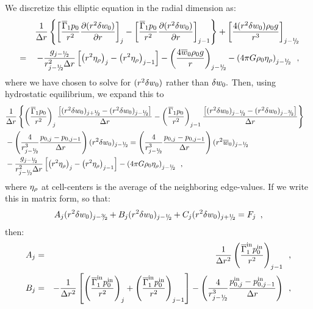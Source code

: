 \begin{enumerate}
\begin{description}
\noindent We discretize this elliptic equation in the radial dimension as:
\begin{eqnarray}
&& \frac{1}{\Delta r} \left\{
\left[ \frac{\gammabar p_0}{r^2} \frac{\partial (r^2 \dw)}{\partial r} \right]_{j} -
\left[ \frac{\gammabar p_0}{r^2} \frac{\partial (r^2 \dw)}{\partial r} \right]_{j-1} \right\}
+ \left[ \frac{4 (r^2 \dw) \rho_0 g}{r^3} \right]_{j-\myhalf} \nonumber\\
&=& 
- \frac{g_{j-\myhalf}}{r_{j-\myhalf}^2 \Delta r} 
\left[ \left( r^2 \etarho \right)_{j} - \left( r^2 \etarho  \right)_{j-1} \right] 
   - \left( \frac{4 \ow \rho_0 g}{r} \right)_{j-\myhalf}
   - \left(  4 \pi G \rhozero \etarho   \right)_{j-\myhalf} \enskip ,
\end{eqnarray}
where we have chosen to solve for $(r^2 \delta w_0)$ rather than $\delta w_0.$
Then, using hydrostatic equilibrium, we expand this to 
\begin{eqnarray}
& \frac{1}{\Delta r} \left\{
 \left( \frac{\gammabar p_0}{r^2}\right)_{j  } \frac{\left[ (r^2 \dw)_{j+\myhalf} - (r^2 \dw)_{j-\myhalf} \right]}{\Delta r} -\left( \frac{\gammabar p_0}{r^2}\right)_{j-1} \frac{\left[ (r^2 \dw)_{j-\myhalf} - (r^2 \dw)_{j-\thalf}\right]}{\Delta r} \right\} & \nonumber \\
&  - \left( \frac{4}{r_{j-\myhalf} ^3} \frac{p_{0,j} - p_{0,j-1}}{\dr} \right) (r^2 \dw)_{j-\myhalf} = \left( \frac{4}{r_{j-\myhalf} ^3} \frac{p_{0,j} - p_{0,j-1}}{\dr} \right) (r^2 \ow)_{j-\myhalf} & \nonumber \\
& - \frac{g_{j-\myhalf}}{r_{j-\myhalf}^2 \Delta r} 
  \left[ \left( r^2 \etarho \right)_{j} - \left( r^2 \etarho  \right)_{j-1} \right] 
- \left(  4 \pi G \rhozero \etarho   \right)_{j-\myhalf} \enskip, &
\end{eqnarray}
where $\eta_{\rho}$ at cell-centers is the average of the neighboring edge-values.  
If we write this in matrix form, so that:
\begin{equation}
A_j (r^2 \dw)_{j-\thalf} + B_j (r^2 \dw)_{j-\myhalf} + C_j (r^2 \dw)_{j+\myhalf} = F_j\enskip,
\end{equation}
then:
\begin{eqnarray}
A_j &=& \frac{1}{\Delta r^2} \left( \frac{\gammabar^{\inp} p_0^{\inp}}{r^2}\right)_{j-1}  \enskip, \\
B_j &=& -\frac{1}{\Delta r^2} \left[ \left( \frac{\gammabar^{\inp} p_0^{\inp}}{r^2}\right)_{j  }  
               +\left( \frac{\gammabar^{\inp} p_0^{\inp}}{r^2}\right)_{j-1} \right] 
              - \left( \frac{4}{r_{j-\myhalf} ^3} \frac{p_{0,j}^{\inp} - p_{0,j-1}^{\inp}}{\dr} \right) \enskip , \\

\end{eqnarray}
\end{description}
\end{enumerate}
